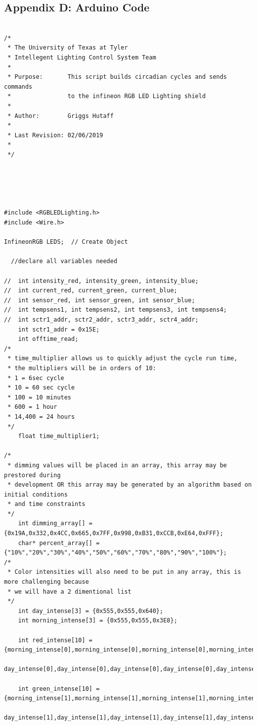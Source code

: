 \documentclass[12pt,a4paper]{report}
\begin{document}
\subsection{Appendix D: Arduino Code} 
\begin{lstlisting}

/*
 * The University of Texas at Tyler
 * Intellegent Lighting Control System Team
 * 
 * Purpose:       This script builds circadian cycles and sends commands
 *                to the infineon RGB LED Lighting shield
 *                
 * Author:        Griggs Hutaff
 * 
 * Last Revision: 02/06/2019
 * 
 */





#include <RGBLEDLighting.h>
#include <Wire.h>

InfineonRGB LEDS;  // Create Object

  //declare all variables needed

//  int intensity_red, intensity_green, intensity_blue;
//  int current_red, current_green, current_blue;
//  int sensor_red, int sensor_green, int sensor_blue;
//  int tempsens1, int tempsens2, int tempsens3, int tempsens4;
//  int sctr1_addr, sctr2_addr, sctr3_addr, sctr4_addr;
    int sctr1_addr = 0x15E;
    int offtime_read;
/*
 * time_multiplier allows us to quickly adjust the cycle run time,
 * the multipliers will be in orders of 10:
 * 1 = 6sec cycle
 * 10 = 60 sec cycle
 * 100 = 10 minutes
 * 600 = 1 hour
 * 14,400 = 24 hours
 */
    float time_multiplier1;

/*
 * dimming values will be placed in an array, this array may be prestored during  
 * development OR this array may be generated by an algorithm based on initial conditions
 * and time constraints
 */
    int dimming_array[] = {0x19A,0x332,0x4CC,0x665,0x7FF,0x998,0xB31,0xCCB,0xE64,0xFFF};
    char* percent_array[] = {"10%","20%","30%","40%","50%","60%","70%","80%","90%","100%"};
/*
 * Color intensities will also need to be put in any array, this is more challenging because
 * we will have a 2 dimentional list
 */
    int day_intense[3] = {0x555,0x555,0x640};
    int morning_intense[3] = {0x555,0x555,0x3E8};

    int red_intense[10] = {morning_intense[0],morning_intense[0],morning_intense[0],morning_intense[0],morning_intense[0],
    day_intense[0],day_intense[0],day_intense[0],day_intense[0],day_intense[0]};
    
    int green_intense[10] = {morning_intense[1],morning_intense[1],morning_intense[1],morning_intense[1],morning_intense[1],
    day_intense[1],day_intense[1],day_intense[1],day_intense[1],day_intense[1]};
    

\end{lstlisting}
\end{document}
